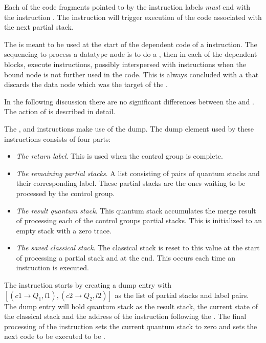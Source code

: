 Each of the code fragments pointed to 
by the instruction labels \emph{must} end with the instruction
. The  instruction  will trigger execution
 of the code associated with the 
next partial stack. 


The  is meant to be used at the start of the dependent
 code of a  instruction.
The  sequencing to process a datatype node is to
do a , then in each of the dependent blocks, execute
 instructions, possibly interspersed with 
 instructions when the bound node is not further used
in the code.
This is always concluded with a  that discards the data node
which was the target of the .

In the following discussion there are no significant differences between the
 and . The action of
 is described in detail.

The ,  and 
 instructions make  use of the dump. The dump element
used by these instructions consists of four parts: 
\begin{itemize}
\item{}\emph{The return label}. This is used 
when the control group is complete.
\item{}\emph{The remaining partial stacks}. A list consisting 
of pairs of quantum stacks and 
their corresponding label. These partial stacks are the ones waiting
 to be processed by the control group. 
\item{}\emph{The result quantum stack}. This quantum stack 
 accumulates the merge result of 
processing each of the control groups partial stacks. This is initialized
to an empty stack with a zero trace.
\item{}\emph{The saved classical stack}. The classical stack is reset to this
value at the start of processing a partial stack and at the end. This 
occurs each time an  instruction is executed.
\end{itemize}


The instruction 
 starts by  creating a dump entry with
$[(c1\rightarrow Q_1,l1),(c2 \rightarrow Q_2,l2)]$ as the
list of partial stacks and label pairs. The 
dump entry will hold  quantum stack as
the result stack, 
the current state of the classical stack  and the address of the 
instruction following the .
The final processing of the 
 instruction sets the current quantum stack to 
zero and sets the next code 
to be executed to be . 

